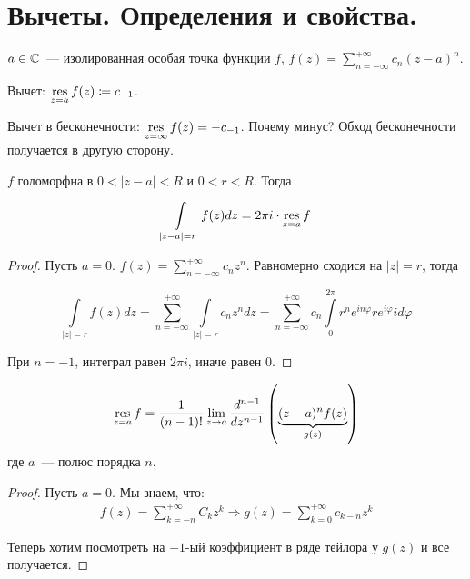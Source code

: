 \section{Вычеты. Определения и свойства.}

\begin{definition}
    $a \in \mathbb{C}$~--- изолированная особая точка функции $f$,
    $f(z) = \sum\limits_{n=-\infty}^{+\infty} c_n (z-a)^n$.

    Вычет: $\operatorname*{res}\limits_{z=a} f(z) \coloneqq c_{-1}$.
\end{definition}

\begin{definition}
    Вычет в бесконечности:
    $\operatorname*{res}\limits_{z=\infty} f(z) = -c_{-1}$.
    Почему минус? Обход бесконечности получается в другую сторону.
\end{definition}

\begin{property}
    $f$ голоморфна в $0 < |z-a| < R$ и $0 < r < R$.
    Тогда

    \[
        \int\limits_{|z-a|=r} f(z)dz = 2\pi i \cdot \operatorname*{res}\limits_{z = a} f
    \]
\end{property}

\begin{proof}
    Пусть $a = 0$. $f(z) = \sum\limits_{n=-\infty}^{+\infty} c_nz^n$.
    Равномерно сходися на $|z| = r$, тогда

    \[
        \int\limits_{|z|=r} f(z)dz = \sum\limits_{n=-\infty}^{+\infty}
        \int\limits_{|z|=r} c_nz^ndz
        = \sum\limits_{n=-\infty}^{+\infty} c_n
        \int\limits_{0}^{2\pi} r^ne^{in\varphi} re^{i\varphi} id\varphi
    \]

    При $n = -1$, интеграл равен $2\pi i$, иначе равен $0$.
\end{proof}

\begin{property}
    \begin{gather*}
        \operatorname*{res}\limits_{z=a} f = \frac{1}{(n-1)!} \lim_{z\to a}
        \frac{d^{n-1}}{dz^{n-1}} \left(\underbrace{(z-a)^n f(z)}_{g(z)}\right)
    \end{gather*}
    где $a$~--- полюс порядка $n$.
\end{property}

\begin{proof}
    Пусть $a = 0$. Мы знаем, что: 
    \begin{align*}
        f(z) = \sum\limits_{k=-n}^{+\infty} C_k z^k \Longrightarrow g(z) = \sum\limits_{k=0}^{+\infty} c_{k-n}z^k
    \end{align*}

    Теперь хотим посмотреть на $-1$-ый коэффициент в ряде тейлора у $g(z)$ и все получается. 
\end{proof}

